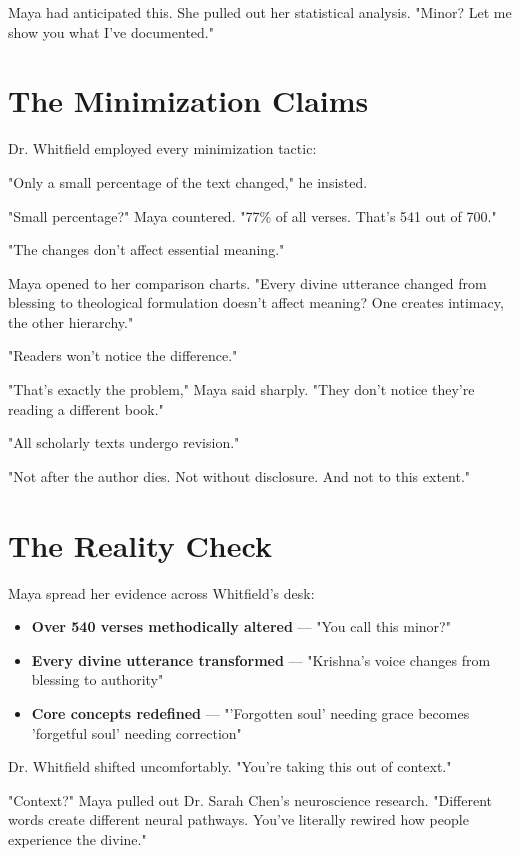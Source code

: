 \documentclass[11pt,twoside]{book}
\begin{document}
Maya had anticipated this. She pulled out her statistical analysis. "Minor? Let me show you what I've documented."
\section*{The Minimization Claims}
\label{sec:org46b13bf}

Dr. Whitfield employed every minimization tactic:

"Only a small percentage of the text changed," he insisted.

"Small percentage?" Maya countered. "77\% of all verses. That's 541 out of 700."

"The changes don't affect essential meaning."

Maya opened to her comparison charts. "Every divine utterance changed from blessing to theological formulation doesn't affect meaning? One creates intimacy, the other hierarchy."

"Readers won't notice the difference."

"That's exactly the problem," Maya said sharply. "They don't notice they're reading a different book."

"All scholarly texts undergo revision."

"Not after the author dies. Not without disclosure. And not to this extent."
\section*{The Reality Check}
\label{sec:org0d6ae0a}

Maya spread her evidence across Whitfield's desk:

\begin{itemize}
\item \textbf{\textbf{Over 540 verses methodically altered}} — "You call this minor?"
\item \textbf{\textbf{Every divine utterance transformed}} — "Krishna's voice changes from blessing to authority"
\item \textbf{\textbf{Core concepts redefined}} — "'Forgotten soul' needing grace becomes 'forgetful soul' needing correction"
\end{itemize}

Dr. Whitfield shifted uncomfortably. "You're taking this out of context."

"Context?" Maya pulled out Dr. Sarah Chen's neuroscience research. "Different words create different neural pathways. You've literally rewired how people experience the divine."
\end{document}
